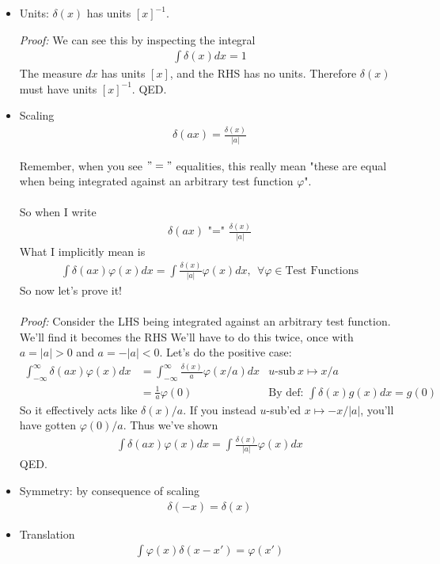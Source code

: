 \documentclass[12pt,fleqn]{article}
\numberwithin{equation}{section} %
\begin{document}
\begin{itemize}
	\item Units: $\delta(x)$ has units $[x]^{-1}$.
	\begin{sidework}
		\emph{Proof:} We can see this by inspecting the integral
		\begin{align}
			\int \delta(x) dx = 1
		\end{align}
		The measure $dx$ has units $[x]$, and the RHS has no units. Therefore $\delta(x)$ must have units $[x]^{-1}$. QED.
	\end{sidework}
	\item Scaling
		\begin{align}
			\delta(a x) = \frac{\delta(x)}{|a|}
		\end{align}
		\begin{sidework}
	Remember, when you see $"="$ equalities, this really mean 
	"these are equal when being integrated against an arbitrary test function $\varphi$".\\
	\\
	So when I write
	\begin{align}
		\delta(a x) \text{ "=" } \frac{\delta(x)}{|a|}
	\end{align}
	What I implicitly mean is
	\begin{align}
		\int \delta(a x) \varphi(x) dx = \int \frac{\delta(x)}{|a|} \varphi(x) dx, ~~\forall \varphi \in \text{Test Functions}
	\end{align} So now let's prove it!\\
	\\
	\emph{Proof:} Consider the LHS being integrated against an arbitrary test function. We'll find it becomes the RHS We'll have to do this twice, once with $a = |a| > 0$ and $a = -|a| < 0$. Let's do the positive case:
	\begin{align}
		\int_{-\infty}^\infty \delta (ax) \varphi (x) dx & = \int_{-\infty}^\infty \frac{\delta(x)}{a} \varphi(x/a) dx  & u\text{-sub}~ x \mapsto x/a\\
		& = \frac{1}{a} \varphi(0) & \text{By def: }\int \delta(x) g(x) dx = g(0)
	\end{align}
	So it effectively acts like $\delta(x)/a$. If you instead $u$-sub'ed $x\mapsto - x /|a|$, you'll have gotten $\varphi(0) / a$. Thus we've shown
	\begin{align}
		\int \delta(ax) \varphi(x) dx = \int \frac{\delta(x)}{|a|} \varphi(x) dx
	\end{align} QED.
\end{sidework}
	\item Symmetry: by consequence of scaling
		\begin{align}
			\delta(-x) = \delta(x)
		\end{align}
	\item Translation
		\begin{align}
			\int \varphi(x) \delta(x- x') = \varphi(x')
		\end{align} 
\end{itemize}
\end{document}
